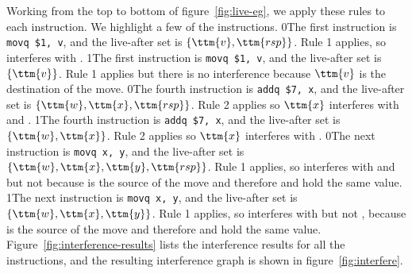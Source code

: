 \documentclass[7x10]{TimesAPriori_MIT}%
\def\racketEd{0}
\def\pythonEd{1}
\def\edition{0}
\newcommand{\racket}[1]{{\if\edition\racketEd{#1}\fi}}
\newcommand{\python}[1]{{\if\edition\pythonEd #1\fi}}
\numberwithin{theorem}{chapter}
\numberwithin{definition}{chapter}
\numberwithin{equation}{chapter}
\begin{document}
Working from the top to bottom of figure~\ref{fig:live-eg}, we apply
these rules to each instruction. We highlight a few of the
instructions.  \racket{The first instruction is \lstinline{movq $1, v},
  and the live-after set is $\{\ttm{v},\ttm{rsp}\}$. Rule 1 applies,
  so \code{v} interferes with \code{rsp}.}
%
\python{The first instruction is \lstinline{movq $1, v}, and the
  live-after set is $\{\ttm{v}\}$. Rule 1 applies but there is
  no interference because $\ttm{v}$ is the destination of the move.}
%
\racket{The fourth instruction is \lstinline{addq $7, x}, and the
  live-after set is $\{\ttm{w},\ttm{x},\ttm{rsp}\}$. Rule 2 applies so
  $\ttm{x}$ interferes with  and \ttm{rsp}.}
%
\python{The fourth instruction is \lstinline{addq $7, x}, and the
  live-after set is $\{\ttm{w},\ttm{x}\}$. Rule 2 applies so
  $$ interferes with .}
%
\racket{The next instruction is \lstinline{movq x, y}, and the
  live-after set is $\{\ttm{w},\ttm{x},\ttm{y},\ttm{rsp}\}$. Rule 1
  applies, so \ttm{y} interferes with \ttm{w} and \ttm{rsp} but not
  \ttm{x} because \ttm{x} is the source of the move and therefore
   and  hold the same value.}
%
\python{The next instruction is \lstinline{movq x, y}, and the
  live-after set is $\{\ttm{w},\ttm{x},\ttm{y}\}$. Rule 1
  applies, so \ttm{y} interferes with \ttm{w} but not
  \ttm{x}, because \ttm{x} is the source of the move and therefore
  \ttm{x} and \ttm{y} hold the same value.}
%
Figure~\ref{fig:interference-results} lists the interference results
for all the instructions, and the resulting interference graph is
shown in figure~\ref{fig:interfere}.
\end{document}
